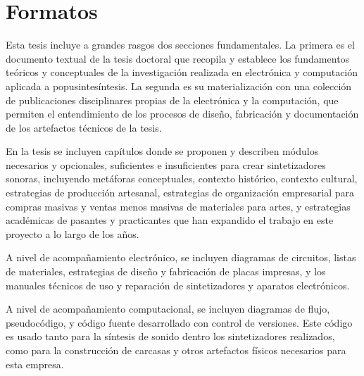 \documentclass[../proyecto.tex]{subfiles}
\begin{document}
\chapter{Formatos}



Esta tesis incluye a grandes rasgos dos secciones fundamentales. La primera es el documento textual de la tesis doctoral que recopila y establece los fundamentos teóricos y conceptuales de la investigación realizada en electrónica y computación aplicada a popusintesíntesis. La segunda es su materialización con una colección de publicaciones disciplinares propias de la electrónica y la computación, que permiten el entendimiento de los procesos de diseño, fabricación y documentación de los artefactos técnicos de la tesis.

En la tesis se incluyen capítulos donde se proponen y describen módulos necesarios y opcionales, suficientes e insuficientes para crear sintetizadores sonoras, incluyendo metáforas conceptuales, contexto histórico, contexto cultural, estrategias de producción artesanal, estrategias de organización empresarial para compras masivas y ventas menos masivas de materiales para artes, y estrategias académicas de pasantes y practicantes que han expandido el trabajo en este proyecto a lo largo de los años.

A nivel de acompañamiento electrónico, se incluyen diagramas de circuitos, listas de materiales, estrategias de diseño y fabricación de placas impresas, y los manuales técnicos de uso y reparación de sintetizadores y aparatos electrónicos.

A nivel de acompañamiento computacional, se incluyen diagramas de flujo, pseudocódigo, y código fuente desarrollado con control de versiones. Este código es usado tanto para la síntesis de sonido dentro los sintetizadores realizados, como para la construcción de carcasas y otros artefactos físicos necesarios para esta empresa.
\end{document}
